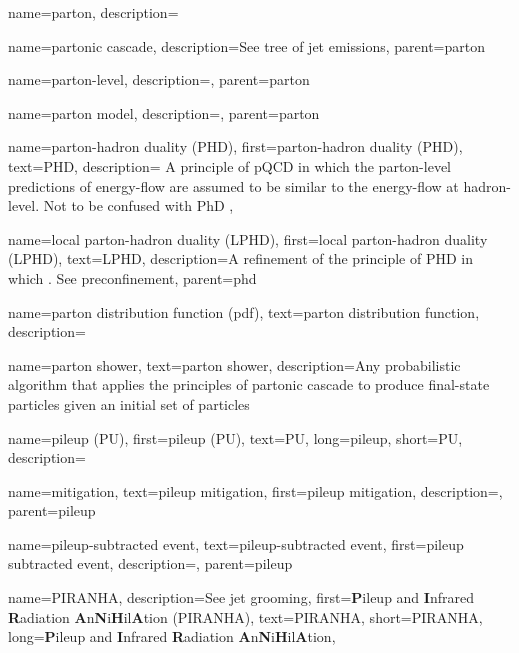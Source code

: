 {
  name=parton,
  description={}
}

    {
      name=partonic cascade,
      description={See tree of jet emissions},
      parent=parton
    }

    {
      name=parton-level,
      description={},
      parent=parton
    }

    {
      name=parton model,
      description={},
      parent=parton
    }


{
  name=parton-hadron duality (PHD),
  first=parton-hadron duality (PHD),
  text=PHD,
  description={
      A principle of pQCD in which the parton-level predictions of energy-flow are assumed to be similar to the energy-flow at hadron-level.
      Not to be confused with PhD 
  },
}

    {
      name=local parton-hadron duality (LPHD),
      first=local parton-hadron duality (LPHD),
      text=LPHD,
      description={A refinement of the principle of PHD in which \sam{}.
      See preconfinement},
      parent=phd
    }




{
  name=parton distribution function (pdf),
  text=parton distribution function,
  description={}
}



{
  name=parton shower,
  text=parton shower,
  description={Any probabilistic algorithm that applies the principles of partonic cascade to produce final-state particles given an initial set of particles}
}


{
  name=pileup (PU),
  first=pileup (PU),
  text=PU,
  long=pileup,
  short=PU,
  description={}
}

    {
      name=mitigation,
      text=pileup mitigation,
      first=pileup mitigation,
      description={},
      parent=pileup
    }

    {
      name=pileup-subtracted event,
      text=pileup-subtracted event,
      first=pileup subtracted event,
      description={},
      parent=pileup
    }

{
    name=PIRANHA,
    description={See jet grooming},
    first={\textbf{P}ileup and \textbf{I}nfrared \textbf{R}adiation \textbf{A}n\textbf{N}i\textbf{H}il\textbf{A}tion (PIRANHA)},
    text={PIRANHA},
    short={PIRANHA},
    long={\textbf{P}ileup and \textbf{I}nfrared \textbf{R}adiation \textbf{A}n\textbf{N}i\textbf{H}il\textbf{A}tion},
}


